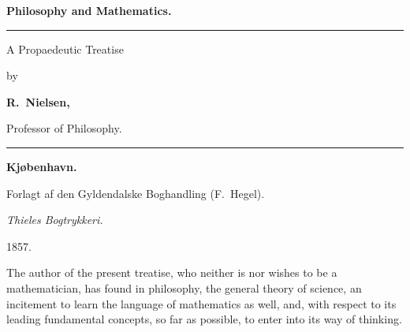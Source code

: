 \documentclass[12pt]{book}
\begin{document}
\begin{titlepage}
\centering
\vspace*{2cm}
{\Huge\bfseries Philosophy and Mathematics.\par}
\vspace{1.2cm}
\rule{4cm}{0.4pt}\par
\vspace{1.2cm}
{\LARGE A Propaedeutic Treatise\par}
\vspace{0.5cm}
{\large by\par}
\vspace{0.8cm}
{\LARGE\bfseries R.\ Nielsen,\par}
\vspace{0.2cm}
{\normalsize Professor of Philosophy.\par}
\vspace{2.4cm}
\rule{4cm}{0.4pt}\par
\vspace{1.6cm}
{\large\bfseries Kjøbenhavn.\par}
\vspace{0.4cm}
{\normalsize Forlagt af den Gyldendalske Boghandling (F.\ Hegel).\par}
\vspace{0.3cm}
{\small\emph{Thieles Bogtrykkeri.}\par}
\vspace{0.6cm}
{\large 1857.\par}
\end{titlepage}

\frontmatter
\tableofcontents
\mainmatter


\noindent The author of the present treatise, who neither is nor wishes to be
a mathematician, has found in philosophy, the general theory of science, an
incitement to learn the language of mathematics as well, and, with respect to
its leading fundamental concepts, so far as possible, to enter into its way of
thinking.

\end{document}

